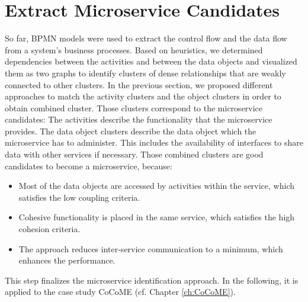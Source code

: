 \section{Extract Microservice Candidates}
\label{sec:Solution:ExtractMicroserviceCandidates}
So far, BPMN models were used to extract the control flow and the data flow from a system's business processes. Based on heuristics, we determined dependencies between the activities and between the data objects and visualized them as two graphs to identify clusters of dense relationships that are weakly connected to other clusters. In the previous section, we proposed different approaches to match the activity clusters and the object clusters in order to obtain combined cluster. Those clusters correspond to the microservice candidates: The activities describe the functionality that the microservice provides. The data object clusters describe the data object which the microservice has to administer. This includes the availability of interfaces to share data with other services if necessary.
Those combined clusters are good candidates to become a microservice, because:
\begin{itemize}
	\item Most of the data objects are accessed by activities within the service, which satisfies the low coupling criteria.
	\item Cohesive functionality is placed in the same service, which satisfies the high cohesion criteria.
	\item The approach reduces inter-service communication to a minimum, which enhances the performance.
\end{itemize}

This step finalizes the microservice identification approach. In the following, it is applied to the case study CoCoME (cf. Chapter \ref{ch:CoCoME}). 










